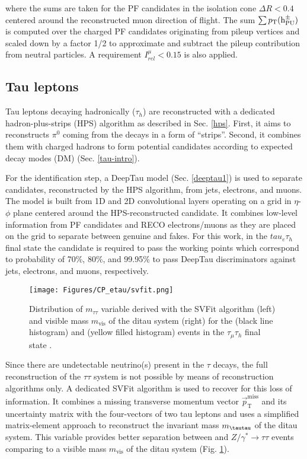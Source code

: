 where the sums are taken for the PF candidates in the isolation cone $\Delta R < 0.4$ centered around the reconstructed muon direction of flight. The sum $\sum p_{\text{T}}(\text{h}^\pm_{\text{PU}})$ is computed over the charged PF candidates originating from pileup vertices and scaled down by a factor 1/2 to approximate and subtract the pileup contribution from neutral particles. A requirement $I^\mu_{rel} < 0.15$ is also applied.  

\subsection{Tau leptons}
Tau leptons decaying hadronically ($\tau_h$) are reconstructed with a dedicated hadron-plus-strips (HPS) algorithm as described in Sec. \ref{hps}. First, it aims to reconstructs $\pi^0$ coming from the \tauh decays in a form of \enquote{strips}. Second, it combines them with charged hadrons to form potential \tauh candidates according to expected decay modes (DM) (Sec. \ref{tau-intro}).

For the identification step, a DeepTau model (Sec. \ref{deeptau1}) is used to separate \tauh candidates, reconstructed by the HPS algorithm, from jets, electrons, and muons. The model is built from 1D and 2D convolutional layers operating on a grid in $\eta$-$\phi$ plane centered around the HPS-reconstructed \tauh candidate. It combines low-level information from PF candidates and RECO electrons/muons as they are placed on the grid to  separate between genuine \tauh and fakes. For this work, in the $tau_e\tau_h$ final state the \tauh candidate is required to pass the working points which correspond to probability of 70\%, 80\%, and 99.95\% to pass DeepTau discriminators against jets, electrons, and muons, respectively.

\begin{figure}[t!]
    \centering
    \texttt{[image: Figures/CP\_etau/svfit.png]}
    \caption{Distribution of $m_{\tau\tau}$ variable derived with the SVFit algorithm (left) and visible mass $m_\text{vis}$ of the ditau system (right) for the \htt (black line histogram) and \ztt (yellow filled histogram) events in the $\tau_\mu\tau_h$ final state \cite{Bianchini:2014vza}.}
    \label{fig:svfit}
\end{figure}

Since there are undetectable neutrino(s) present in the $\tau$ decays, the full reconstruction of the $\tau\tau$ system is not possible by means of \tauh reconstruction algorithms only. A dedicated SVFit algorithm \cite{Bianchini:2014vza} is used to recover for this loss of information. It combines a missing transverse momentum vector $\Vec{p}_\text{T}^\text{miss}$ and its uncertainty matrix with the four-vectors of two tau leptons and uses a simplified matrix-element approach to reconstruct the invariant mass $m_{\tautau}$ of the ditau system. This variable provides better separation between \htt and $Z/\gamma^*\to\tau\tau$ events comparing to a visible mass $m_\text{vis}$ of the ditau system (Fig. \ref{fig:svfit}).    


